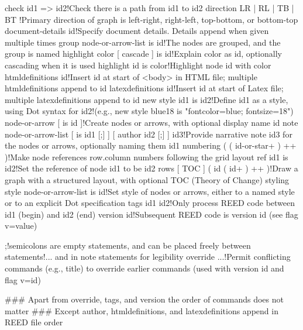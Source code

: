 check id1 => id2!Check there is a path from id1 to id2
direction { LR | RL | TB | BT }!Primary direction of graph is left-right, right-left, top-bottom, or bottom-top
document-details id!Specify document details. Details append when given multiple times
group node-or-arrow-list is id!The nodes are grouped, and the group is named
highlight color [ cascade ] is id!Explain color as id, optionally cascading when it is used
highlight id is color!Highlight node id with color
htmldefinitions id!Insert id at start of <body> in HTML file; multiple htmldefinitions append to id
latexdefinitions id!Insert id at start of Latex file; multiple latexdefinitions append to id 
new style id1 is id2!Define id1 as a style, using Dot syntax for id2!(e.g., new style blue18 is "fontcolor=blue; fontsize=18")
node-or-arrow [ is id ]!Create nodes or arrows, with optional display name id
note node-or-arrow-list [ is id1 [;] ] [ author id2 [;] ] id3!Provide narrative note id3 for the nodes or arrows, optionally naming them id1
numbering ( { ( id-or-star+ ) }++ )!Make node references row.column numbers following the grid layout
ref id1 is id2!Set the reference of node id1 to be id2
rows [ TOC ] ( { id ( id+ ) }++ )!Draw a graph with a structured layout, with optional TOC (Theory of Change) styling
style node-or-arrow-list is id!Set style of nodes or arrows, either to a named style or to an explicit Dot specification
tags id1 id2!Only process REED code between id1 (begin) and id2 (end)
version id!Subsequent REED code is version id (see flag v=value)

;!semicolons are empty statements, and can be placed freely between statements!... and in note statements for legibility
override ...!Permit conflicting commands (e.g., title) to override earlier commands (used with version id and flag v=id)

### Apart from override, tags, and version the order of commands does not matter
### Except author, htmldefinitions, and latexdefinitions append in REED file order


